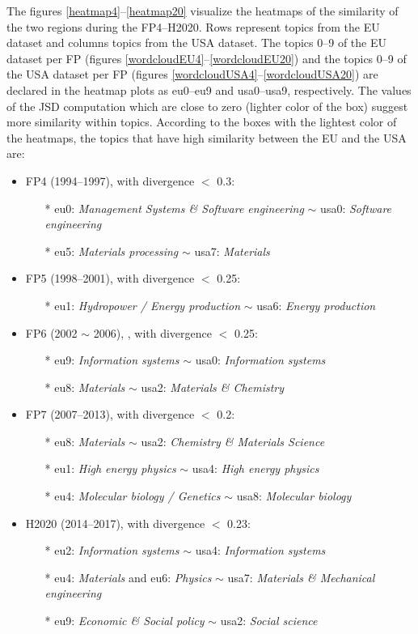 \documentclass[12pt]{report}
\begin{document}
The figures \ref{heatmap4}--\ref{heatmap20} visualize the heatmaps of
the similarity of the two regions during the FP4--H2020. Rows represent
topics from the EU dataset and columns topics from the USA dataset.
The topics 0--9 of the EU dataset per FP (figures \ref{wordcloudEU4}--\ref{wordcloudEU20}) and the topics 0--9 of the USA dataset per FP (figures \ref{wordcloudUSA4}--\ref{wordcloudUSA20}) are declared in the heatmap plots as
eu0--eu9 and usa0--usa9, respectively.
The values of the JSD computation which are close to zero (lighter
color of the box) suggest more similarity within topics. According to 
the boxes with the lightest color of the heatmaps, 
the topics that have high similarity between the EU and the USA are:

\begin{itemize}
\item FP4 (1994--1997), with divergence $<$ 0.3:
\begin{itemize}
\item[*] eu0: \emph{Management Systems \& Software engineering} $\sim$ usa0: \emph{Software engineering}
\item[*] eu5: \emph{Materials processing} $\sim$ usa7: \emph{Materials}
\end{itemize}
\item FP5 (1998--2001), with divergence $<$ 0.25:
\begin{itemize}
\item[*] eu1: \emph{Hydropower / Energy production} $\sim$ usa6: \emph{Energy production}
\end{itemize}
\item FP6 (2002 $\sim$ 2006), , with divergence $<$ 0.25:
\begin{itemize}
\item[*] eu9: \emph{Information systems} $\sim$ usa0: \emph{Information systems}
\item[*] eu8: \emph{Materials} $\sim$ usa2: \emph{Materials \& Chemistry}
\end{itemize}
\item FP7 (2007--2013), with divergence $<$ 0.2:
\begin{itemize}
\item[*] eu8: \emph{Materials} $\sim$ usa2: \emph{Chemistry \& Materials Science}
\item[*] eu1: \emph{High energy physics} $\sim$ usa4: \emph{High energy physics}
\item[*] eu4: \emph{Molecular biology / Genetics} $\sim$ usa8: \emph{Molecular biology}
\end{itemize}
\item H2020 (2014--2017), with divergence $<$ 0.23:
\begin{itemize}
\item[*] eu2: \emph{Information systems} $\sim$ usa4: \emph{Information systems}
\item[*] eu4: \emph{Materials} and eu6: \emph{Physics} $\sim$ usa7: \emph{Materials \& Mechanical engineering}
\item[*] eu9: \emph{Economic \& Social policy} $\sim$ usa2: \emph{Social science}
\end{itemize}
\end{itemize}
\end{document}
